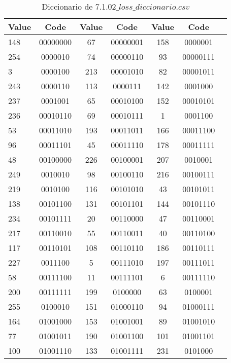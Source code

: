\documentclass[conference,onecolumn,12pt]{IEEEtran}
\numberwithin{equation}{subsection}
\begin{document}
\begin{table}[h]
\centering
\caption{Diccionario de 7.1.02$\_loss\_diccionario.csv$}
\label{tab:loss_dict_compact}
\begin{tabular}{lcccccc}
\hline
\textbf{Value} & \textbf{Code} & \textbf{Value} & \textbf{Code} & \textbf{Value} & \textbf{Code} \\ \hline
148 & 00000000 & 67 & 00000001 & 158 & 0000001 \\ \hline
254 & 0000010 & 74 & 00000110 & 93 & 00000111 \\ \hline
3 & 0000100 & 213 & 00001010 & 82 & 00001011 \\ \hline
243 & 0000110 & 113 & 0000111 & 142 & 0001000 \\ \hline
237 & 0001001 & 65 & 00010100 & 152 & 00010101 \\ \hline
236 & 00010110 & 69 & 00010111 & 1 & 0001100 \\ \hline
53 & 00011010 & 193 & 00011011 & 166 & 00011100 \\ \hline
96 & 00011101 & 45 & 00011110 & 178 & 00011111 \\ \hline
48 & 00100000 & 226 & 00100001 & 207 & 0010001 \\ \hline
249 & 0010010 & 98 & 00100110 & 216 & 00100111 \\ \hline
219 & 0010100 & 116 & 00101010 & 43 & 00101011 \\ \hline
138 & 00101100 & 131 & 00101101 & 144 & 00101110 \\ \hline
234 & 00101111 & 20 & 00110000 & 47 & 00110001 \\ \hline
217 & 00110010 & 55 & 00110011 & 40 & 00110100 \\ \hline
117 & 00110101 & 108 & 00110110 & 186 & 00110111 \\ \hline
227 & 0011100 & 5 & 00111010 & 197 & 00111011 \\ \hline
58 & 00111100 & 11 & 00111101 & 6 & 00111110 \\ \hline
200 & 00111111 & 199 & 0100000 & 63 & 0100001 \\ \hline
255 & 0100010 & 151 & 01000110 & 94 & 01000111 \\ \hline
164 & 01001000 & 153 & 01001001 & 89 & 01001010 \\ \hline
77 & 01001011 & 190 & 01001100 & 101 & 01001101 \\ \hline
100 & 01001110 & 133 & 01001111 & 231 & 0101000 \\ \hline

\end{tabular}
\end{table}
\end{document}
